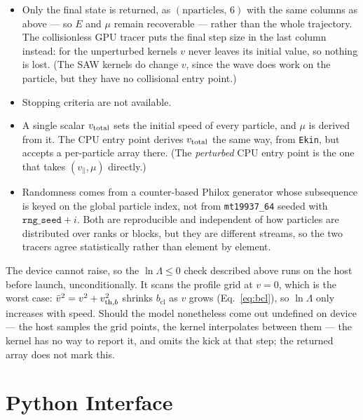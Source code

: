 \documentclass[11pt]{article}
\newcommand{\vpar}{v_{\!\parallel}}
\newcommand{\vth}[1][]{v_{\mathrm{th}\ifx&#1&\else,#1\fi}}
\newcommand{\lnL}{\ln\Lambda}
\begin{document}
\begin{itemize}
  \item Only the final state is returned, as $(\text{nparticles},\,6)$ with
        the same columns as above --- so $E$ and $\mu$ remain recoverable ---
        rather than the whole trajectory.  The collisionless GPU tracer puts
        the final step size in the last column instead: for the unperturbed
        kernels $v$ never leaves its initial value, so nothing is lost.  (The
        SAW kernels do change $v$, since the wave does work on the particle,
        but they have no collisional entry point.)
  \item Stopping criteria are not available.
  \item A single scalar $v_{\rm total}$ sets the initial speed of every
        particle, and $\mu$ is derived from it.  The CPU entry point derives
        $v_{\rm total}$ the same way, from \texttt{Ekin}, but accepts a
        per-particle array there.  (The \emph{perturbed} CPU entry point is
        the one that takes $(\vpar, \mu)$ directly.)
  \item Randomness comes from a counter-based Philox generator whose
        subsequence is keyed on the global particle index, not from
        \texttt{mt19937\_64} seeded with $\texttt{rng\_seed} + i$.  Both are
        reproducible and independent of how particles are distributed over
        ranks or blocks, but they are different streams, so the two tracers
        agree statistically rather than element by element.
\end{itemize}

The device cannot raise, so the $\lnL \leq 0$ check described above runs on
the host before launch, unconditionally.  It scans the profile grid at $v=0$,
which is the worst case: $\bar{v}^2 = v^2 + \vth[b]^2$ shrinks
$b_{\mathrm{cl}}$ as $v$ grows (Eq.~\eqref{eq:bcl}), so $\lnL$ only increases
with speed.  Should the model nonetheless come out undefined on device --- the
host samples the grid points, the kernel interpolates between them --- the
kernel has no way to report it, and omits the kick at that step; the returned
array does not mark this.

\section{Python Interface}
\end{document}

